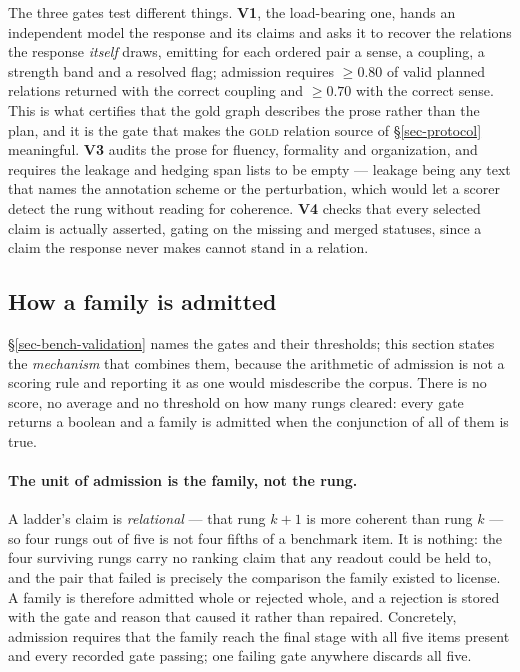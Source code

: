 The three gates test different things. \textbf{V1}, the load-bearing one, hands an independent model the
response and its claims and asks it to recover the relations the response \emph{itself} draws, emitting
for each ordered pair a sense, a coupling, a strength band and a resolved flag; admission requires
$\ge 0.80$ of valid planned relations returned with the correct coupling and $\ge 0.70$ with the correct
sense. This is what certifies that the gold graph describes the prose rather than the plan, and it is the
gate that makes the \textsc{gold} relation source of \S\ref{sec-protocol} meaningful. \textbf{V3} audits the prose
for fluency, formality and organization, and requires the leakage and hedging span lists to be empty ---
leakage being any text that names the annotation scheme or the perturbation, which would let a scorer
detect the rung without reading for coherence. \textbf{V4} checks that every selected claim is actually
asserted, gating on the \textsf{missing} and \textsf{merged} statuses, since a claim the response never
makes cannot stand in a relation.

\subsection{How a family is admitted}
\label{sec-bench-admission}

\S\ref{sec-bench-validation} names the gates and their thresholds; this section states the
\emph{mechanism} that combines them, because the arithmetic of admission is not a scoring rule and
reporting it as one would misdescribe the corpus. There is no score, no average and no threshold on how
many rungs cleared: every gate returns a boolean and a family is admitted when the conjunction of all of
them is true.

\paragraph{The unit of admission is the family, not the rung.} A ladder's claim is \emph{relational} --- that
rung $k{+}1$ is more coherent than rung $k$ --- so four rungs out of five is not four fifths of a benchmark
item. It is nothing: the four surviving rungs carry no ranking claim that any readout could be held to, and
the pair that failed is precisely the comparison the family existed to license. A family is therefore
admitted whole or rejected whole, and a rejection is stored with the gate and reason that caused it rather
than repaired. Concretely, admission requires that the family reach the final stage with all five items
present and every recorded gate passing; one failing gate anywhere discards all five.

